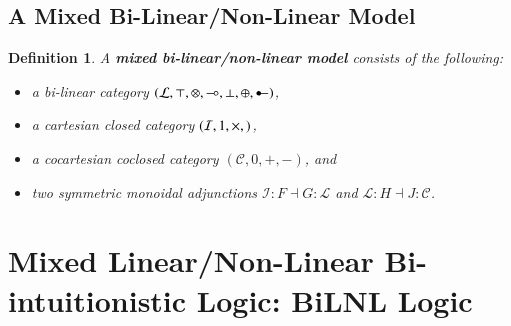 \documentclass{lmcs}
\newtheorem{definition}[theorem]{Definition}
\let\to\relax
\newcommand{\to}{\rightarrow}
\newcommand{\cat}[1]{\mathcal{#1}}
\newcommand{\limp}[0]{\multimap}
\newcommand{\colimp}[0]{\multimapdotinv}
\begin{document}
\subsection{A Mixed Bi-Linear/Non-Linear Model}
\label{subsec:a_mixed_bi-linear_non-linear_model}
\begin{definition}
  \label{def:biLNL-model}
  A \textbf{mixed bi-linear/non-linear model} consists of the
  following:
  \begin{itemize}
  \item[i.] a bi-linear category $(\cat{L},
    \top,\otimes,\limp,\perp,\oplus,\colimp)$,
  \item[ii.] a cartesian closed category $(\cat{I},1,\times,\to)$,
  \item[iii.] a cocartesian coclosed category $(\cat{C},0,+,-)$, and
  \item[iv.] two symmetric monoidal adjunctions $\cat{I} : F \dashv G
    : \cat{L}$ and $\cat{L} : H \dashv J : \cat{C}$.
  \end{itemize}
\end{definition}


\section{Mixed Linear/Non-Linear Bi-intuitionistic Logic: BiLNL Logic}
\label{sec:bilnl_logic}
\end{document}
